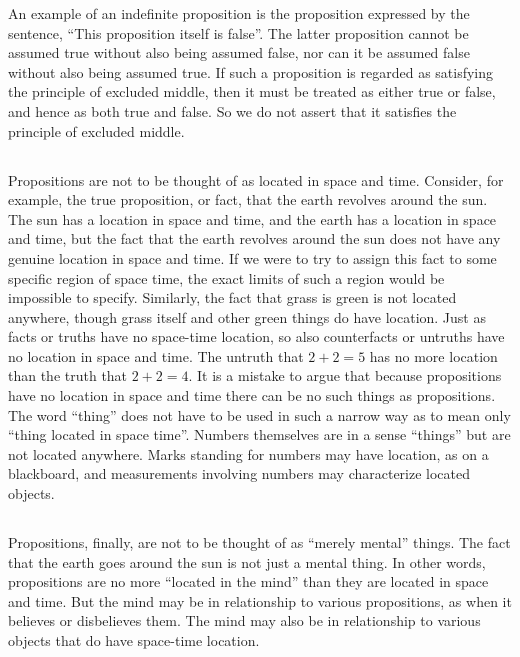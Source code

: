 \documentclass{book}
\begin{document}
An example of an indefinite proposition is the proposition expressed by the sentence, “This proposition itself is false”.  The latter proposition cannot be assumed true without also being assumed false, nor can it be assumed false without also being assumed true.  If such a proposition is regarded as satisfying the principle of excluded middle, then it must be treated as either true or false, and hence as both true and false.  So we do not assert that it satisfies the principle of excluded middle.

\subsection{}
\label{sec:2.15}

Propositions are not to be thought of as located in space and time.  Consider, for example, the true proposition, or fact, that the earth revolves around the sun.  The sun has a location in space and time, and the earth has a location in space and time, but the fact that the earth revolves around the sun does not have any genuine location in space and time.  If we were to try to assign this fact to some specific region of space time, the exact limits of such a region would be impossible to specify.  Similarly, the fact that grass is green is not located anywhere, though grass itself and other green things do have location.  Just as facts or truths have no space-time location, so also counterfacts or untruths have no location in space and time.  The untruth that \(2 + 2 = 5\) has no more location than the truth that \(2 + 2 = 4\).  It is a mistake to argue that because propositions have no location in space and time there can be no such things as propositions.  The word “thing” does not have to be used in such a narrow way as to mean only “thing located in space time”.  Numbers themselves are in a sense “things” but are not located anywhere.  Marks standing for numbers may have location, as on a blackboard, and measurements involving numbers may characterize located objects.

\subsection{}
\label{sec:2.16}

Propositions, finally, are not to be thought of as “merely mental” things.  The fact that the earth goes around the sun is not just a mental thing.  In other words, propositions are no more “located in the mind” than they are located in space and time.  But the mind may be in relationship to various propositions, as when it believes or disbelieves them.  The mind may also be in relationship to various objects that do have space-time location.
\end{document}
